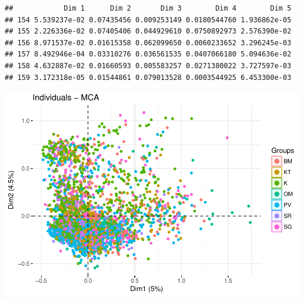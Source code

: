 \documentclass[11pt,]{article}
\newenvironment{Shaded}{\begin{snugshade}}{\end{snugshade}}
\newcommand{\CommentTok}[1]{\textcolor[rgb]{0.56,0.35,0.01}{\textit{#1}}}
\newcommand{\DataTypeTok}[1]{\textcolor[rgb]{0.13,0.29,0.53}{#1}}
\newcommand{\KeywordTok}[1]{\textcolor[rgb]{0.13,0.29,0.53}{\textbf{#1}}}
\newcommand{\NormalTok}[1]{#1}
\newcommand{\OperatorTok}[1]{\textcolor[rgb]{0.81,0.36,0.00}{\textbf{#1}}}
\newcommand{\OtherTok}[1]{\textcolor[rgb]{0.56,0.35,0.01}{#1}}
\newcommand{\StringTok}[1]{\textcolor[rgb]{0.31,0.60,0.02}{#1}}
\begin{document}
\begin{verbatim}
##            Dim 1      Dim 2       Dim 3        Dim 4        Dim 5
## 154 5.539237e-02 0.07435456 0.009253149 0.0180544760 1.936862e-05
## 155 2.226336e-02 0.07405406 0.044929610 0.0750892973 2.576390e-02
## 156 8.971537e-02 0.01615358 0.062099650 0.0060233652 3.296245e-03
## 157 8.492946e-04 0.03310276 0.036561535 0.0407066180 5.094636e-02
## 158 4.632887e-02 0.01660593 0.005583257 0.0271380022 3.727597e-03
## 159 3.172318e-05 0.01544861 0.079013528 0.0003544925 6.453300e-03
\end{verbatim}

\begin{Shaded}
\end{Shaded}

\includegraphics{describe_FSMintentions_regional_seasonal_iDE-Camb_surveysOct2017_files/figure-latex/MCA_results-15.pdf}
\end{document}
